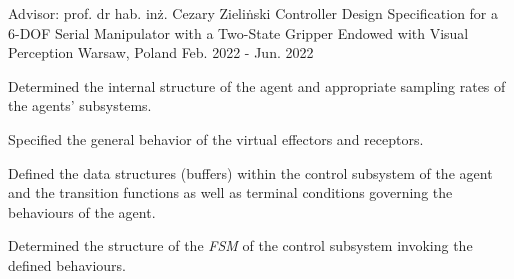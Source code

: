 \begin{cventries}
  \cventry
    {Advisor: prof. dr hab. in{\.z}. Cezary Zieli{\.n}ski} %
    {Controller Design Specification for a 6-DOF Serial Manipulator with a Two-State Gripper Endowed with Visual Perception} %
    {Warsaw, Poland} %
    {Feb. 2022 - Jun. 2022} %
    {
      \begin{cvitems} %
        \item {Determined the internal structure of the agent and appropriate sampling rates of the agents’ subsystems.}
        \item {Specified the general behavior of the virtual effectors and receptors.}
        \item {Defined the data structures (buffers) within the control subsystem of the agent and the transition functions as well as terminal conditions governing the behaviours of the agent.}
        \item {Determined the structure of the \emph{FSM} of the control subsystem invoking the defined behaviours.}
      \end{cvitems}
    }

\end{cventries}
